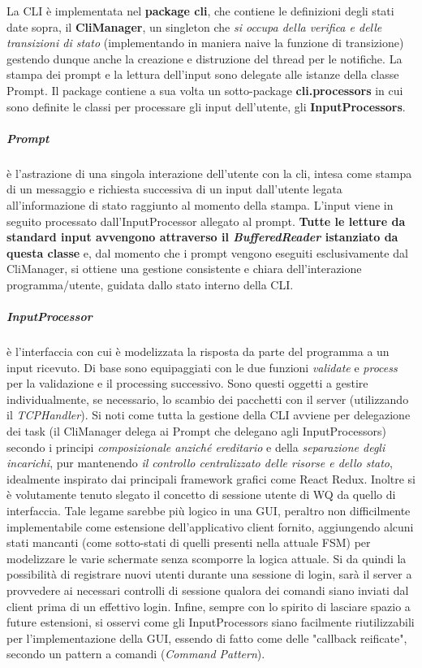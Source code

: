 \documentclass{article}
\begin{document}
    La CLI è implementata nel \textbf{package cli}, che contiene le definizioni degli stati date sopra, il \textbf{CliManager}\label{CliManager}, un singleton che \textit{si occupa della verifica e delle transizioni di stato} (implementando in maniera naive la funzione di transizione) gestendo dunque anche la creazione e distruzione del thread per le notifiche. La stampa dei prompt e la lettura dell'input sono delegate alle istanze della classe Prompt. Il package contiene a sua volta un sotto-package \textbf{cli.processors} in cui sono definite le classi per processare gli input dell'utente, gli \textbf{InputProcessors}.

    \subparagraph{Prompt} è l'astrazione di una singola interazione dell'utente con la cli, intesa come stampa di un messaggio e richiesta successiva di un input dall'utente legata all'informazione di stato raggiunto al momento della stampa. L'input viene in seguito processato dall'InputProcessor allegato al prompt. \textbf{Tutte le letture da standard input avvengono attraverso il \textit{BufferedReader} istanziato da questa classe} e, dal momento che i prompt vengono eseguiti esclusivamente dal CliManager, si ottiene una gestione consistente e chiara dell'interazione programma/utente, guidata dallo stato interno della CLI.

    \subparagraph{InputProcessor} è l'interfaccia con cui è modelizzata la risposta da parte del programma a un input ricevuto. Di base sono equipaggiati con le due funzioni \emph{validate} e \emph{process} per la validazione e il processing successivo. Sono questi oggetti a gestire individualmente, se necessario, lo scambio dei pacchetti con il server (utilizzando il \textit{TCPHandler}).
    \newline
    \newline
    Si noti come tutta la gestione della CLI avviene per delegazione dei task (il CliManager delega ai Prompt che delegano agli InputProcessors) secondo i principi \emph{composizionale anziché ereditario} e della \emph{separazione degli incarichi}, pur mantenendo \emph{il controllo centralizzato delle risorse e dello stato}, idealmente inspirato dai principali framework grafici come React Redux. Inoltre si è volutamente tenuto slegato il concetto di sessione utente di WQ da quello di interfaccia. Tale legame sarebbe più logico in una GUI, peraltro non difficilmente implementabile come estensione dell'applicativo client fornito, aggiungendo alcuni stati mancanti (come sotto-stati di quelli presenti nella attuale FSM) per modelizzare le varie schermate senza scomporre la logica attuale. Si da quindi la possibilità di registrare nuovi utenti durante una sessione di login, sarà il server a provvedere ai necessari controlli di sessione qualora dei comandi siano inviati dal client prima di un effettivo login. Infine, sempre con lo spirito di lasciare spazio a future estensioni, si osservi come gli InputProcessors siano facilmente riutilizzabili per l'implementazione della GUI, essendo di fatto come delle "callback reificate", secondo un pattern a comandi (\textit{Command Pattern}).
\end{document}
